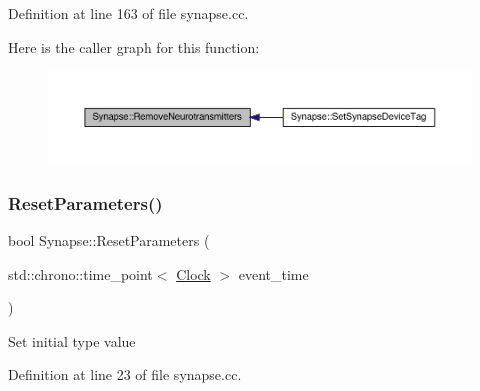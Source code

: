 Definition at line 163 of file synapse.\+cc.

Here is the caller graph for this function\+:\nopagebreak
\begin{figure}[H]
\begin{center}
\leavevmode
\includegraphics[width=350pt]{class_synapse_adcf623e56f90e07344537d71c0a5d51b_icgraph}
\end{center}
\end{figure}
\mbox{\label{class_synapse_a5b2bbc3553e92492a5c38d1d797fcd92}} 
\subsubsection{\texorpdfstring{Reset\+Parameters()}{ResetParameters()}}
{\footnotesize\ttfamily bool Synapse\+::\+Reset\+Parameters (\begin{DoxyParamCaption}\item[{std\+::chrono\+::time\+\_\+point$<$ \hyperlink{universe_8h_a0ef8d951d1ca5ab3cfaf7ab4c7a6fd80}{Clock} $>$}]{event\+\_\+time }\end{DoxyParamCaption})}

Set initial type value 

Definition at line 23 of file synapse.\+cc.

